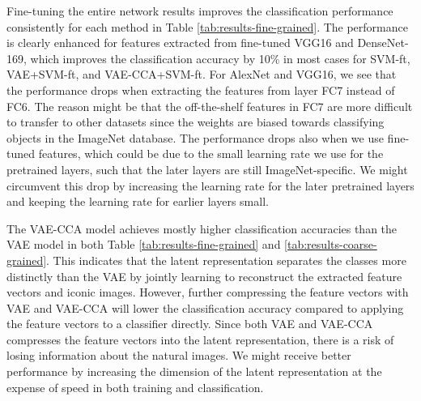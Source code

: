 Fine-tuning the entire network results improves the classification performance consistently for each method in Table \ref{tab:results-fine-grained}. The performance is clearly enhanced for features extracted from fine-tuned VGG16 and DenseNet-169, which improves the classification accuracy by 10\% in most cases for SVM-ft, VAE+SVM-ft, and VAE-CCA+SVM-ft. For AlexNet and VGG16, we see that the performance drops when extracting the features from layer FC7 instead of FC6. The reason might be that the off-the-shelf features in FC7 are more difficult to transfer to other datasets since the weights are biased towards classifying objects in the ImageNet database. The performance drops also when we use fine-tuned features, which could be due to the small learning rate we use for the pretrained layers, such that the later layers are still ImageNet-specific. We might circumvent this drop by increasing the learning rate for the later pretrained layers and keeping the learning rate for earlier layers small.
 
The VAE-CCA model achieves mostly higher classification accuracies than the VAE model in both Table \ref{tab:results-fine-grained} and \ref{tab:results-coarse-grained}. This indicates that the latent representation separates the classes more distinctly than the VAE by jointly learning to reconstruct the extracted feature vectors and iconic images. However, further compressing the feature vectors with VAE and VAE-CCA will lower the classification accuracy compared to applying the feature vectors to a classifier directly. Since both VAE and VAE-CCA compresses the feature vectors into the latent representation, there is a risk of losing information about the natural images. We might receive better performance by increasing the dimension of the latent representation at the expense of speed in both training and classification.

